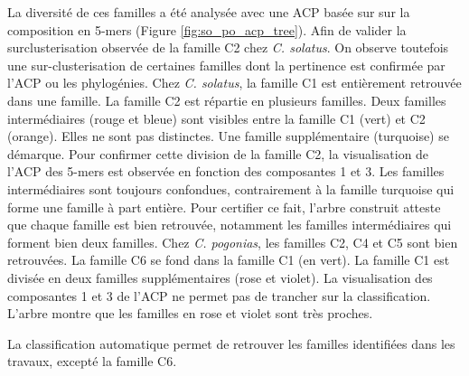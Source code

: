 \documentclass[12pt,a4paper]{article}
\begin{document}
			La diversité de ces familles a été analysée avec une ACP basée sur sur la composition en 5-mers (Figure \ref{fig:so_po_acp_tree}). Afin de valider la surclusterisation observée de la famille C2 chez \textit{C. solatus}. On observe toutefois une sur-clusterisation de certaines familles dont la pertinence est confirmée par l'ACP ou les phylogénies. Chez \textit{C. solatus}, la famille C1 est entièrement retrouvée dans une famille. La famille C2 est répartie en plusieurs familles. Deux familles intermédiaires (rouge et bleue) sont visibles entre la famille C1 (vert)  et C2 (orange). Elles ne sont pas distinctes.  Une famille supplémentaire (turquoise) se démarque. Pour confirmer cette division de la famille C2, la visualisation de l'ACP des 5-mers est observée en fonction des composantes 1 et 3. Les familles intermédiaires sont toujours confondues, contrairement à la famille turquoise qui forme une famille à part entière. Pour certifier ce fait, l'arbre construit atteste que chaque famille est bien retrouvée, notamment les familles intermédiaires qui forment bien deux familles. Chez \textit{C. pogonias}, les familles C2, C4 et C5 sont bien retrouvées. La famille C6 se fond dans la famille C1 (en vert). La famille C1 est divisée en deux familles supplémentaires (rose et violet). La visualisation des composantes 1 et 3 de l'ACP ne permet pas de trancher sur la classification. L'arbre montre que les familles en rose et violet sont très proches.  
			
			La classification automatique permet de retrouver les familles identifiées dans les travaux, excepté la famille C6.
			 
\end{document}
